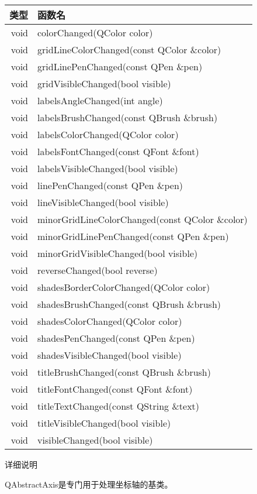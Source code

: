 \begin{tabular}{|r|l|}
\hline 
类型 & 函数名\\
\hline
void&	colorChanged(QColor color)\\
\hline
void&	gridLineColorChanged(const QColor \&color)\\
\hline
void&	gridLinePenChanged(const QPen \&pen)\\
\hline
void&	gridVisibleChanged(bool visible)\\
\hline
void&	labelsAngleChanged(int angle)\\
\hline
void&	labelsBrushChanged(const QBrush \&brush)\\
\hline
void&	labelsColorChanged(QColor color)\\
\hline
void&	labelsFontChanged(const QFont \&font)\\
\hline
void&	labelsVisibleChanged(bool visible)\\
\hline
void&	linePenChanged(const QPen \&pen)\\
\hline
void&	lineVisibleChanged(bool visible)\\
\hline
void&	minorGridLineColorChanged(const QColor \&color)\\
\hline
void&	minorGridLinePenChanged(const QPen \&pen)\\
\hline
void&	minorGridVisibleChanged(bool visible)\\
\hline
void&	reverseChanged(bool reverse)\\
\hline
void&	shadesBorderColorChanged(QColor color)\\
\hline
void&	shadesBrushChanged(const QBrush \&brush)\\
\hline
void&	shadesColorChanged(QColor color)\\
\hline
void&	shadesPenChanged(const QPen \&pen)\\
\hline
void&	shadesVisibleChanged(bool visible)\\
\hline
void&	titleBrushChanged(const QBrush \&brush)\\
\hline
void&	titleFontChanged(const QFont \&font)\\
\hline
void&	titleTextChanged(const QString \&text)\\
\hline
void&	titleVisibleChanged(bool visible)\\
\hline
void&	visibleChanged(bool visible)\\
\hline
\end{tabular}

详细说明

QAbstractAxis是专门用于处理坐标轴的基类。

